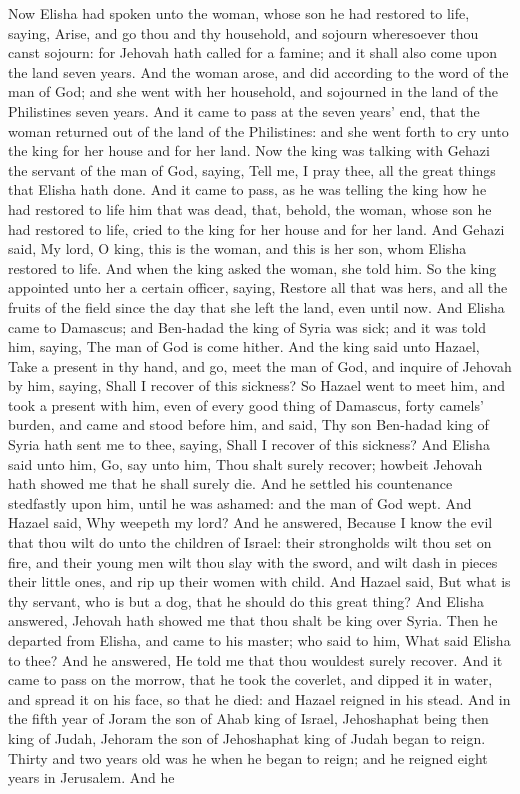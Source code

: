 Now Elisha had spoken unto the woman, whose son he had restored to life, saying, Arise, and go thou and thy household, and sojourn wheresoever thou canst sojourn: for Jehovah hath called for a famine; and it shall also come upon the land seven years. And the woman arose, and did according to the word of the man of God; and she went with her household, and sojourned in the land of the Philistines seven years. And it came to pass at the seven years’ end, that the woman returned out of the land of the Philistines: and she went forth to cry unto the king for her house and for her land. Now the king was talking with Gehazi the servant of the man of God, saying, Tell me, I pray thee, all the great things that Elisha hath done. And it came to pass, as he was telling the king how he had restored to life him that was dead, that, behold, the woman, whose son he had restored to life, cried to the king for her house and for her land. And Gehazi said, My lord, O king, this is the woman, and this is her son, whom Elisha restored to life. And when the king asked the woman, she told him. So the king appointed unto her a certain officer, saying, Restore all that was hers, and all the fruits of the field since the day that she left the land, even until now.  And Elisha came to Damascus; and Ben-hadad the king of Syria was sick; and it was told him, saying, The man of God is come hither. And the king said unto Hazael, Take a present in thy hand, and go, meet the man of God, and inquire of Jehovah by him, saying, Shall I recover of this sickness? So Hazael went to meet him, and took a present with him, even of every good thing of Damascus, forty camels’ burden, and came and stood before him, and said, Thy son Ben-hadad king of Syria hath sent me to thee, saying, Shall I recover of this sickness? And Elisha said unto him, Go, say unto him, Thou shalt surely recover; howbeit Jehovah hath showed me that he shall surely die. And he settled his countenance stedfastly upon him, until he was ashamed: and the man of God wept. And Hazael said, Why weepeth my lord? And he answered, Because I know the evil that thou wilt do unto the children of Israel: their strongholds wilt thou set on fire, and their young men wilt thou slay with the sword, and wilt dash in pieces their little ones, and rip up their women with child. And Hazael said, But what is thy servant, who is but a dog, that he should do this great thing? And Elisha answered, Jehovah hath showed me that thou shalt be king over Syria. Then he departed from Elisha, and came to his master; who said to him, What said Elisha to thee? And he answered, He told me that thou wouldest surely recover. And it came to pass on the morrow, that he took the coverlet, and dipped it in water, and spread it on his face, so that he died: and Hazael reigned in his stead.  And in the fifth year of Joram the son of Ahab king of Israel, Jehoshaphat being then king of Judah, Jehoram the son of Jehoshaphat king of Judah began to reign. Thirty and two years old was he when he began to reign; and he reigned eight years in Jerusalem. And he 